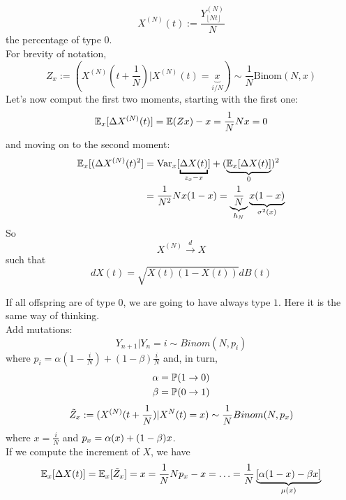 \documentclass{article}
\begin{document}
\begin{enumerate}
	\begin{equation*}
		X^{(N)}(t) := \frac{Y^{(N)}_{\lfloor Nt\rfloor}}{N}
	\end{equation*}
	the percentage of type $0$. \\
	For brevity of notation, 
	\begin{equation*}
		Z_x := (X^{(N)}(t+\frac{1}{N})|X^{(N)}(t)=\underbrace{x}_{i/N})\sim\frac{1}{N}\text{Binom}(N,x)
	\end{equation*}
	Let's now comput the first two moments, starting with the first one:
	\begin{equation*}
		\mathbb{E}_x[\Delta X^{(N)}(t)] = \mathbb{E}(Zx) - x  =\frac{1}{N} N x = 0
	\end{equation*}
	and moving on to the second moment:
	\begin{align*}
		\mE_x[(\Delta X^{(N)}(t)^2] &= \text{Var}_x[\underbracket{\Delta X(t)}_{z_x-x}] + (\underbrace{\mE_x[\Delta X(t)]}_{0})^2 \\
		&= \frac{1}{N^2}Nx(1-x) = \underbrace{\frac{1}{N}}_{h_N} \underbrace{x(1-x)}_{\sigma^2 (x)}
	\end{align*}
	So 
	\begin{equation*}
		X^{(N)}\xrightarrow{d} X
	\end{equation*}
	such that 
	\begin{equation*}
		dX(t) = \sqrt{X(t) (1-X(t))} d B(t)
	\end{equation*}
	\begin{figure}
		\centering
		
	\end{figure}
	If all offspring are of type $0$, we are going to have always type $1$. Here it is the same way of thinking. \\
	Add mutations:
	\begin{equation*}
		Y_{n+1}| Y_n =i \sim Binom(N,p_i)
	\end{equation*}
	where $p_i = \alpha(1- \frac{i}{N}) + (1-\beta )\frac{i}{N}$ and, in turn, 
	\begin{align*}
		\alpha &= \mathbb{P}(1 \rightarrow 0) \\
		\beta &= \mathbb{P}(0 \rightarrow 1)
	\end{align*}
	\begin{equation*}
		\Tilde{Z}_x := (X^{(N)}(t+\frac{1}{N})|X^{N}(t) = x) \sim \frac{1}{N} Binom(N, p_x)
	\end{equation*}
	where $x= \frac{i}{N}$ and $p_x = \alpha(\-x) + (1-\beta )x$. \\
	If we compute the increment of $X$, we have
	\[
	\mathbb{E}_x[\Delta X(t)] = \mathbb{E}_x[\Tilde{Z}_x] = x = \frac{1}{N} N p_x - x = \ldots = \frac{1}{N} \underbrace{[\alpha (1-x)-\beta x]}_{\mu(x)}
	\]
	

\end{enumerate}
\end{document}
